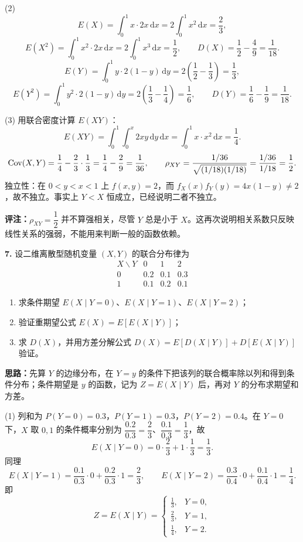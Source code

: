 (2)
\[
E(X)=\int_0^1 x\cdot2x\,\mathrm{d}x=2\int_0^1x^2\,\mathrm{d}x=\frac23,
\]
\[
E(X^2)=\int_0^1x^2\cdot2x\,\mathrm{d}x=2\int_0^1x^3\,\mathrm{d}x=\frac12,
\qquad D(X)=\frac12-\frac49=\frac1{18}.
\]
\[
E(Y)=\int_0^1y\cdot2(1-y)\,\mathrm{d}y=2\left(\frac12-\frac13\right)=\frac13,
\]
\[
E(Y^2)=\int_0^1y^2\cdot2(1-y)\,\mathrm{d}y=2\left(\frac13-\frac14\right)=\frac16,
\qquad D(Y)=\frac16-\frac19=\frac1{18}.
\]

(3) 用联合密度计算 $E(XY)$：
\[
E(XY)=\int_0^1\!\!\int_0^x2xy\,\mathrm{d}y\,\mathrm{d}x
=\int_0^1x\cdot x^2\,\mathrm{d}x=\frac14.
\]
\[
\operatorname{Cov}(X,Y)=\frac14-\frac23\cdot\frac13=\frac14-\frac29=\frac1{36},
\qquad
\rho_{XY}=\frac{1/36}{\sqrt{(1/18)(1/18)}}=\frac{1/36}{1/18}=\frac12.
\]
独立性：在 $0<y<x<1$ 上 $f(x,y)=2$，而 $f_X(x)f_Y(y)=4x(1-y)\ne2$，故不独立。事实上 $Y<X$ 恒成立，已经说明二者不独立。

\textbf{评注：}$\rho_{XY}=\dfrac12$ 并不算强相关，尽管 $Y$ 总是小于 $X$。这再次说明相关系数只反映线性关系的强弱，不能用来判断一般的函数依赖。


\else \answerarea[10] \fi

\textbf{7.} 设二维离散型随机变量 $(X,Y)$ 的联合分布律为
\[
\begin{array}{c|ccc}
X\backslash Y & 0 & 1 & 2\\
\hline
0 & 0.2 & 0.1 & 0.3\\
1 & 0.1 & 0.2 & 0.1
\end{array}
\]
\begin{enumerate}[label=(\arabic*)]
    \item 求条件期望 $E(X\mid Y=0)$、$E(X\mid Y=1)$、$E(X\mid Y=2)$；
    \item 验证重期望公式 $E(X)=E[E(X\mid Y)]$；
    \item 求 $D(X)$，并用方差分解公式 $D(X)=E[D(X\mid Y)]+D[E(X\mid Y)]$ 验证。
\end{enumerate}

\ifshowsolutions%
\textbf{思路：}先算 $Y$ 的边缘分布，在 $Y=y$ 的条件下把该列的联合概率除以列和得到条件分布；条件期望是 $y$ 的函数，记为 $Z=E(X\mid Y)$ 后，再对 $Y$ 的分布求期望和方差。

(1) 列和为 $P(Y=0)=0.3$，$P(Y=1)=0.3$，$P(Y=2)=0.4$。在 $Y=0$ 下，$X$ 取 $0,1$ 的条件概率分别为 $\dfrac{0.2}{0.3}=\dfrac23$、$\dfrac{0.1}{0.3}=\dfrac13$，故
\[
E(X\mid Y=0)=0\cdot\frac23+1\cdot\frac13=\frac13.
\]
同理
\[
E(X\mid Y=1)=\frac{0.1}{0.3}\cdot0+\frac{0.2}{0.3}\cdot1=\frac23,
\qquad
E(X\mid Y=2)=\frac{0.3}{0.4}\cdot0+\frac{0.1}{0.4}\cdot1=\frac14.
\]
即
\[
Z=E(X\mid Y)=\begin{cases}\frac13,&Y=0,\\[2pt]\frac23,&Y=1,\\[2pt]\frac14,&Y=2.\end{cases}
\]

